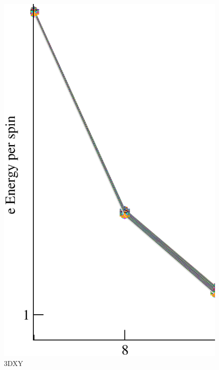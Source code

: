 \begin{figure}[!htpb]
  \centering
  \includegraphics[width=15cm]{./plots/3DXY/3DXY_Energy_vs_L.eps}
  \caption{3DXY}
\end{figure}

